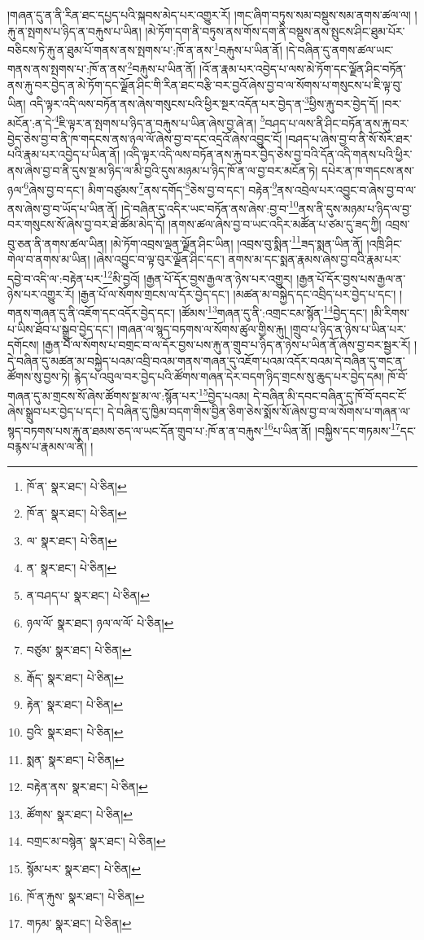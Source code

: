 །གཞན་དུ་ན་ནི་རིན་ཐང་དཔྱད་པའི་སྐབས་མེད་པར་འགྱུར་རོ། །གང་ཞིག་བཏུས་སམ་བསྡུས་སམ་ནགས་ཚལ་ལ། །རྐུ་ན་སྤགས་པ་ཉིད་ན་བརྐུས་པ་ཡིན། །མེ་ཏོག་དག་ནི་བཏུས་ནས་གོས་དག་ནི་བསྡུས་ནས་སྤུངས་ཤིང་ཐུམ་པོར་བཅིངས་ཏེ་རྐུ་ན་ཐུམ་པོ་གནས་ནས་སྤགས་པ་:ཁོ་ན་ནས་\footnote{ཁོ་ན་  སྣར་ཐང་།  པེ་ཅིན། }བརྐུས་པ་ཡིན་ནོ། །དེ་བཞིན་དུ་ནགས་ཚལ་ཡང་གནས་ནས་སྤགས་པ་:ཁོ་ན་ནས་\footnote{ཁོ་ན་  སྣར་ཐང་།  པེ་ཅིན། }བརྐུས་པ་ཡིན་ནོ། །འོ་ན་རྣམ་པར་འབྱེད་པ་ལས་མེ་ཏོག་དང་ལྗོན་ཤིང་བཏོན་ནས་རྐུ་བར་བྱེད་ན་མེ་ཏོག་དང་ལྗོན་ཤིང་གི་རིན་ཐང་བརྩི་བར་བྱའོ་ཞེས་བྱ་བ་ལ་སོགས་པ་གསུངས་པ་ཇི་ལྟ་བུ་ཡིན། འདི་ལྟར་འདི་ལས་བཏོན་ནས་ཞེས་གསུངས་པའི་ཕྱིར་སྔར་འདོན་པར་བྱེད་ན་\footnote{ལ་  སྣར་ཐང་།  པེ་ཅིན། }ཕྱིས་རྐུ་བར་བྱེད་དོ། །བར་མངོན་:ན་དེ་\footnote{ན་  སྣར་ཐང་།  པེ་ཅིན། }ཇི་ལྟར་ན་སྤགས་པ་ཉིད་ན་བརྐུས་པ་ཡིན་ཞེས་བྱ་ཞེ་ན། \footnote{ན་བཤད་པ་  སྣར་ཐང་།  པེ་ཅིན། }བཤད་པ་ལས་ནི་ཤིང་བཏོན་ནས་རྐུ་བར་བྱེད་ཅེས་བྱ་བ་ནི་ཁ་གདངས་ནས་ཉལ་ལོ་ཞེས་བྱ་བ་དང་འདྲའོ་ཞེས་འབྱུང་ངོ། །བཤད་པ་ཞེས་བྱ་བ་ནི་སོ་སོར་ཐར་པའི་རྣམ་པར་འབྱེད་པ་ཡིན་ནོ། །འདི་ལྟར་འདི་ལས་བཏོན་ནས་རྐུ་བར་བྱེད་ཅེས་བྱ་བའི་དོན་འདི་གནས་པའི་ཕྱིར་ནས་ཞེས་བྱ་བ་ནི་དུས་སྔ་མ་ཉིད་ལ་མི་བྱའི་དུས་མཉམ་པ་ཉིད་ཁོ་ན་ལ་བྱ་བར་མངོན་ཏེ། དཔེར་ན་ཁ་གདངས་ནས་ཉལ་\footnote{ཉལ་ལོ་  སྣར་ཐང་། ཉལ་ལ་ལོ་  པེ་ཅིན། }ཞེས་བྱ་བ་དང་། མིག་བཙུམས་\footnote{བཙུམ་  སྣར་ཐང་།  པེ་ཅིན། }ནས་དགོད་\footnote{རྒོད་  སྣར་ཐང་།  པེ་ཅིན། }ཅེས་བྱ་བ་དང་། བརྟེན་\footnote{རྟེན་  སྣར་ཐང་།  པེ་ཅིན། }ནས་འབྲེལ་པར་འབྱུང་བ་ཞེས་བྱ་བ་ལ་ནས་ཞེས་བྱ་བ་ཡོད་པ་ཡིན་ནོ། །དེ་བཞིན་དུ་འདིར་ཡང་བཏོན་ནས་ཞེས་:བྱ་བ་\footnote{བྱའི་  སྣར་ཐང་།  པེ་ཅིན། }ནས་ནི་དུས་མཉམ་པ་ཉིད་ལ་བྱ་བར་གསུངས་སོ་ཞེས་བྱ་བར་ཐེ་ཚོམ་མེད་དོ། །ནགས་ཚལ་ཞེས་བྱ་བ་ཡང་འདིར་མཚོན་པ་ཙམ་དུ་ཟད་ཀྱི། འབྲས་བུ་ཅན་ནི་ནགས་ཚལ་ཡིན། །མེ་ཏོག་འབྲས་ལྡན་ལྗོན་ཤིང་ཡིན། །འབྲས་བུ་སྨིན་\footnote{སྨན་  སྣར་ཐང་།  པེ་ཅིན། }ཟད་སྨན་ཡིན་ནོ། །འཁྲི་ཤིང་གེལ་བ་ནགས་མ་ཡིན། །ཞེས་འབྱུང་བ་ལྟ་བུར་ལྗོན་ཤིང་དང་། ནགས་མ་དང་སྨན་རྣམས་ཞེས་བྱ་བའི་རྣམ་པར་དབྱེ་བ་འདི་ལ་:བརྟེན་པར་\footnote{བརྟེན་ནས་  སྣར་ཐང་།  པེ་ཅིན། }མི་བྱའོ། །རྒྱན་པོ་དོར་བྱས་རྒྱལ་ན་ཉེས་པར་འགྱུར། །རྒྱན་པོ་དོར་བྱས་པས་རྒྱལ་ན་ཉེས་པར་འགྱུར་རོ། །རྒྱན་པོ་ལ་སོགས་གྲངས་ལ་དོར་བྱེད་དང་། །མཚན་མ་བསྐྱེད་དང་འབྲིད་པར་བྱེད་པ་དང་། །གནས་གཞན་དུ་ནི་འཇོག་དང་འདོར་བྱེད་དང་། །ཚོམས་\footnote{ཚོགས་  སྣར་ཐང་།  པེ་ཅིན། }གཞན་དུ་ནི་:འགྲང་ངམ་སྙོན་\footnote{བགྲང་མ་བསྙེན་  སྣར་ཐང་།  པེ་ཅིན། }བྱེད་དང་། །མི་རིགས་པ་ཡིས་ཐོབ་པ་སྒྲུབ་བྱེད་དང་། །གཞན་ལ་སྙད་བཏགས་ལ་སོགས་ཚུལ་གྱིས་རྐུ། །གྲུབ་པ་ཉིད་ན་ཉེས་པ་ཡིན་པར་དགོངས། །རྒྱན་པོ་ལ་སོགས་པ་བགྲང་བ་ལ་དོར་བྱས་པས་རྐུ་ན་གྲུབ་པ་ཉིད་ན་ཉེས་པ་ཡིན་ནོ་ཞེས་བྱ་བར་སྦྱར་རོ། །དེ་བཞིན་དུ་མཚན་མ་བསྐྱེད་པའམ་འབྲི་བའམ་གནས་གཞན་དུ་འཇོག་པའམ་འདོར་བའམ་དེ་བཞིན་དུ་གང་ན་ཚོགས་སུ་བྱས་ཏེ། རྙེད་པ་འབུལ་བར་བྱེད་པའི་ཚོགས་གཞན་དེར་བདག་ཉིད་གྲངས་སུ་ཆུད་པར་བྱེད་དམ། ཁོ་བོ་གཞན་དུ་མ་གྲངས་སོ་ཞེས་ཚོགས་སྔ་མ་ལ་:སྙོན་པར་\footnote{སྙོམ་པར་  སྣར་ཐང་།  པེ་ཅིན། }བྱེད་པའམ། དེ་བཞིན་མི་དབང་བཞིན་དུ་ཁོ་བོ་དབང་ངོ་ཞེས་སྒྲུབ་པར་བྱེད་པ་དང་། དེ་བཞིན་དུ་ཁྱིམ་བདག་གིས་བྱིན་ཅིག་ཅེས་སྨོས་སོ་ཞེས་བྱ་བ་ལ་སོགས་པ་གཞན་ལ་སྙད་བཏགས་པས་རྐུ་ན་ཐམས་ཅད་ལ་ཡང་དོན་གྲུབ་པ་:ཁོ་ན་ན་བརྐུས་\footnote{ཁོ་ན་རྐུས་  སྣར་ཐང་།  པེ་ཅིན། }པ་ཡིན་ནོ། །བསྐྱིས་དང་གཏམས་\footnote{གཏམ་  སྣར་ཐང་།  པེ་ཅིན། }དང་བརྙས་པ་རྣམས་ལ་ནི། །

